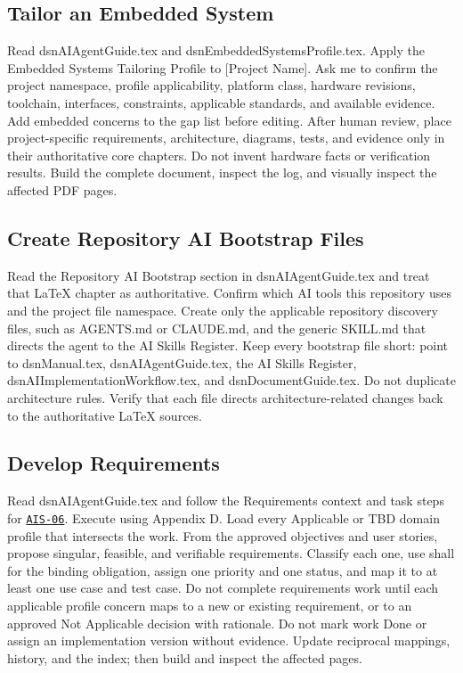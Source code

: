 \subsection{Tailor an Embedded System}
\begingroup\ttfamily\raggedright
\noindent Read dsnAIAgentGuide.tex and dsnEmbeddedSystemsProfile.tex. Apply the Embedded Systems Tailoring Profile to [Project Name]. Ask me to confirm the project namespace, profile applicability, platform class, hardware revisions, toolchain, interfaces, constraints, applicable standards, and available evidence. Add embedded concerns to the gap list before editing. After human review, place project-specific requirements, architecture, diagrams, tests, and evidence only in their authoritative core chapters. Do not invent hardware facts or verification results. Build the complete document, inspect the log, and visually inspect the affected PDF pages.\par
\endgroup


\subsection{Create Repository AI Bootstrap Files}
\begingroup\ttfamily\raggedright
\noindent Read the Repository AI Bootstrap section in dsnAIAgentGuide.tex and treat that LaTeX chapter as authoritative. Confirm which AI tools this repository uses and the project file namespace. Create only the applicable repository discovery files, such as AGENTS.md or CLAUDE.md, and the generic SKILL.md that directs the agent to the AI Skills Register. Keep every bootstrap file short: point to dsnManual.tex, dsnAIAgentGuide.tex, the AI Skills Register, dsnAIImplementationWorkflow.tex, and dsnDocumentGuide.tex. Do not duplicate architecture rules. Verify that each file directs architecture-related changes back to the authoritative LaTeX sources.\par
\endgroup


\subsection{Develop Requirements}
\begingroup\ttfamily\raggedright
\noindent Read dsnAIAgentGuide.tex and follow the Requirements context and task steps for \hyperref[Skill:AIS-06]{\texttt{AIS-06}}. Execute using Appendix D. Load every Applicable or TBD domain profile that intersects the work. From the approved objectives and user stories, propose singular, feasible, and verifiable requirements. Classify each one, use shall for the binding obligation, assign one priority and one status, and map it to at least one use case and test case. Do not complete requirements work until each applicable profile concern maps to a new or existing requirement, or to an approved Not Applicable decision with rationale. Do not mark work Done or assign an implementation version without evidence. Update reciprocal mappings, history, and the index; then build and inspect the affected pages.\par
\endgroup


